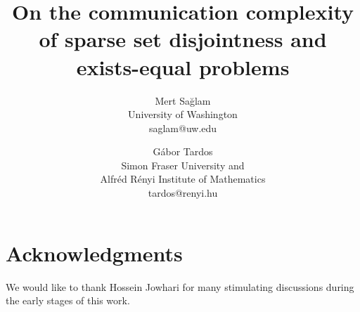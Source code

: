 \documentclass[10pt,letterpaper]{article}
\begin{document}
\title{\Large\bf On the communication complexity of 
sparse set disjointness and exists-equal problems}
\author{
\normalsize Mert Sağlam\\%
\small University of Washington\\%
\small saglam@uw.edu \and
\normalsize Gábor Tardos\\
\small Simon Fraser University and\\
\small Alfréd Rényi Institute of Mathematics\\
\small tardos@renyi.hu}
\date{}

\maketitle
\thispagestyle{empty}
\vspace{-7.5mm}


\newpage
\tableofcontents








\section*{Acknowledgments}
We would like to thank Hossein Jowhari for many stimulating
discussions during the early stages of this work.

\printbibliography
\end{document}
